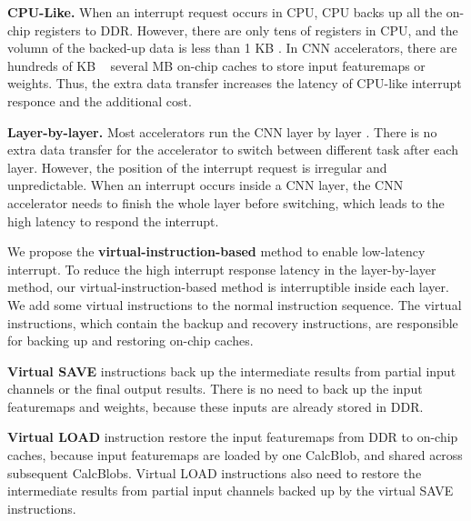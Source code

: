 \textbf{CPU-Like.}
When an interrupt request occurs in CPU, CPU backs up all the on-chip registers to DDR. However, there are only tens of registers in CPU, and the volumn of the backed-up data is less than 1 KB \cite{furber2000arm}. In CNN accelerators, there are hundreds of KB ~ several MB on-chip caches \cite{qiu2016going, guo2017angel} to store input featuremaps or weights. 
Thus, the extra data transfer increases the latency of CPU-like interrupt responce and the additional cost.

\textbf{Layer-by-layer.}
Most accelerators run the CNN layer by layer \cite{qiu2016going,guo2017angel}. 
There is no extra data transfer for the accelerator to switch between different task after each layer.
However, the position of the interrupt request is irregular and unpredictable. When an interrupt occurs inside a CNN layer, the CNN accelerator needs to finish the whole layer before switching, which leads to the high latency to respond the interrupt.



We propose the \textbf{virtual-instruction-based} method to enable low-latency interrupt. 
To reduce the high interrupt response latency in the layer-by-layer method, our virtual-instruction-based method is interruptible inside each layer. We add some virtual instructions to the normal instruction sequence.
The virtual instructions, which contain the backup and recovery instructions, are responsible for backing up and restoring on-chip caches. 

\textbf{Virtual SAVE} instructions back up the intermediate results from partial input channels or the final output results. There is no need to back up the input featuremaps and weights, because these inputs are already stored in DDR. 

\textbf{Virtual LOAD} instruction restore the input featuremaps from DDR to on-chip caches, because input featuremaps are loaded by one CalcBlob, and shared across subsequent CalcBlobs.
Virtual LOAD instructions also need to restore the intermediate results from partial input channels backed up by the virtual SAVE instructions.


